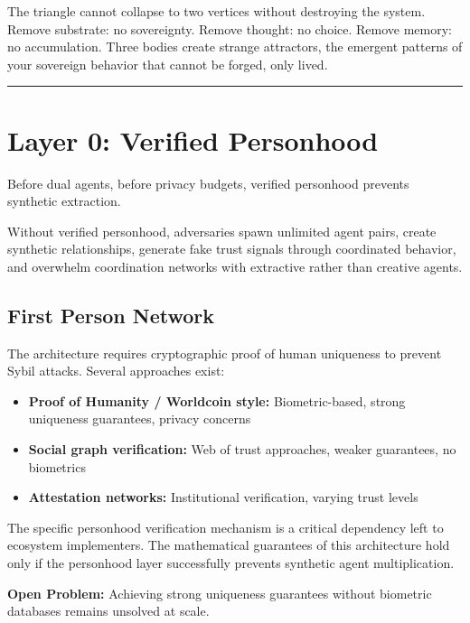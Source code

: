 \documentclass[
  11pt,
]{article}
\providecommand{\tightlist}{%
  \setlength{\itemsep}{0pt}\setlength{\parskip}{0pt}}
\begin{document}
The triangle cannot collapse to two vertices without destroying the
system. Remove substrate: no sovereignty. Remove thought: no choice.
Remove memory: no accumulation. Three bodies create strange attractors,
the emergent patterns of your sovereign behavior that cannot be forged,
only lived.

\begin{center}\rule{0.5\linewidth}{0.5pt}\end{center}

\section{Layer 0: Verified
Personhood}\label{layer-0-verified-personhood}

Before dual agents, before privacy budgets, verified personhood prevents
synthetic extraction.

Without verified personhood, adversaries spawn unlimited agent pairs,
create synthetic relationships, generate fake trust signals through
coordinated behavior, and overwhelm coordination networks with
extractive rather than creative agents.

\subsection{First Person Network}\label{first-person-network}

The architecture requires cryptographic proof of human uniqueness to
prevent Sybil attacks. Several approaches exist:

\begin{itemize}
\tightlist
\item
  \textbf{Proof of Humanity / Worldcoin style:} Biometric-based, strong
  uniqueness guarantees, privacy concerns
\item
  \textbf{Social graph verification:} Web of trust approaches, weaker
  guarantees, no biometrics
\item
  \textbf{Attestation networks:} Institutional verification, varying
  trust levels
\end{itemize}

The specific personhood verification mechanism is a critical dependency
left to ecosystem implementers. The mathematical guarantees of this
architecture hold only if the personhood layer successfully prevents
synthetic agent multiplication.

\textbf{Open Problem:} Achieving strong uniqueness guarantees without
biometric databases remains unsolved at scale.
\end{document}
